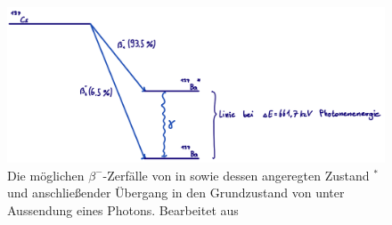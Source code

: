         \FloatBarrier

        \begin{figure}[h]
          \centering
          \includegraphics[width = 1\textwidth]{pictures/cs.png}
          \caption{Die möglichen $\beta^-$-Zerfälle von  in  sowie dessen angeregten Zustand $^*$ und anschließender Übergang in den Grundzustand von  unter Aussendung eines Photons. Bearbeitet aus \cite{stolz_radioaktivitat_2003}}
          \label{fig:cs_schema}
        \end{figure}
    
        \FloatBarrier
        
%
%


